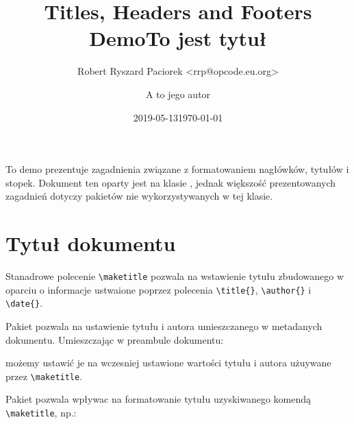 \documentclass[fontSize=10pt,extra]{pdfArticle}
\title {Titles, Headers and Footers Demo}
\author{Robert Ryszard Paciorek <rrp@opcode.eu.org>}
\date  {2019-05-13}
\begin{document}
To demo prezentuje zagadnienia związane z formatowaniem nagłówków, tytułów i stopek.
Dokument ten oparty jest na klasie ,
	jednak większość prezentowanych zagadnień dotyczy pakietów nie wykorzystywanych w tej klasie.

\section{Tytuł dokumentu}

Stanadrowe polecenie \Verb$\maketitle$ pozwala na wstawienie tytułu zbudowanego w oparciu o informacje ustwaione poprzez polecenia \Verb$\title{}$, \Verb$\author{}$ i \Verb$\date{}$.

\begin{Example}
\title {To jest tytuł}
\author{A to jego autor}
\date  {1970-01-01}
\maketitle
\end{Example}

Pakiet  pozwala na ustawienie tytułu i autora umieszczanego w metadanych dokumentu. Umieszczając w preambule dokumentu:
\begin{MintedCode}
\makeatletter{}\makeatother
\end{MintedCode}
\vspace{-\parskip}
możemy ustawić je na wczesniej ustawione wartości tytułu i autora użuywane przez \Verb$\maketitle$.

Pakiet  pozwala wpływac na formatowanie tytułu uzyskiwanego komendą \Verb$\maketitle$, np.:
\begin{Example}
\renewcommand{\maketitlehooka}{\vspace{-44pt}}
\renewcommand{\maketitlehookb}{\vspace{-14pt}}
\renewcommand{\maketitlehookd}{\vspace{-13pt}}
\renewcommand{\maketitlehookd}{\vspace{-12pt}} 
\maketitle
\end{Example}
\end{document}
